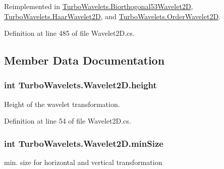 \-Reimplemented in \hyperlink{class_turbo_wavelets_1_1_biorthogonal53_wavelet2_d_acec9bb2730e6dee78c8f6d5c8d79a523}{\-Turbo\-Wavelets.\-Biorthogonal53\-Wavelet2\-D}, \hyperlink{class_turbo_wavelets_1_1_haar_wavelet2_d_a55f6abb99bf5d87017e715b63f64cc15}{\-Turbo\-Wavelets.\-Haar\-Wavelet2\-D}, and \hyperlink{class_turbo_wavelets_1_1_order_wavelet2_d_af45baa14b0d867362b989db7d41f14dc}{\-Turbo\-Wavelets.\-Order\-Wavelet2\-D}.



\-Definition at line 485 of file \-Wavelet2\-D.\-cs.



\subsection{\-Member \-Data \-Documentation}
\hypertarget{class_turbo_wavelets_1_1_wavelet2_d_afb2aa87b89b82f329357cbdc0cde18a8}{
\subsubsection[{height}]{\setlength{\rightskip}{0pt plus 5cm}int {\bf \-Turbo\-Wavelets.\-Wavelet2\-D.\-height}}}\label{class_turbo_wavelets_1_1_wavelet2_d_afb2aa87b89b82f329357cbdc0cde18a8}


\-Height of the wavelet transformation. 



\-Definition at line 54 of file \-Wavelet2\-D.\-cs.

\hypertarget{class_turbo_wavelets_1_1_wavelet2_d_af5148ef1a46dd5694ccea13aa8f1b9e2}{
\subsubsection[{min\-Size}]{\setlength{\rightskip}{0pt plus 5cm}int {\bf \-Turbo\-Wavelets.\-Wavelet2\-D.\-min\-Size}}}\label{class_turbo_wavelets_1_1_wavelet2_d_af5148ef1a46dd5694ccea13aa8f1b9e2}


min. size for horizontal and vertical transformation 



